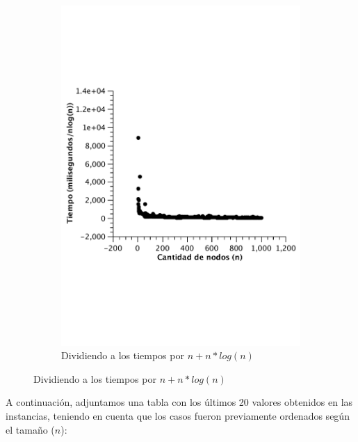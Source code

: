 \begin{figure}[H]
        \begin{subfigure}[b]{0.5\textwidth}
                \includegraphics[width=\textwidth]{imagenes/vacio-listas-4.pdf}
                \caption{Dividiendo a los tiempos por $n + n*log(n)$}
        \end{subfigure}

\end{figure}

A continuación, adjuntamos una tabla con los últimos 20 valores obtenidos en las instancias, teniendo en cuenta que los casos fueron previamente ordenados según el tamaño ($n$):


